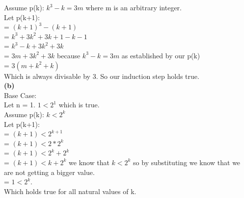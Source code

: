 Assume p(k): $k^3-k = 3m$ where m is an arbitrary integer.\\
Let p(k+1):\\
 = $(k + 1)^3 - (k + 1)$\\
 = $k^3 + 3k^2 + 3k + 1 - k - 1$\\
 = $k^3 - k +3k^2 + 3k$\\
 = $3m +3k^2 + 3k$ because $k^3 - k = 3m$ as established by our p(k)\\
 = $3(m +k^2 + k)$\\
 Which is always divisable by 3. So our induction step holds true. {\Huge\Bat}\\
\textbf{(b)}\\
Base Case:\\
Let n = 1. $1<2^1$ which is true.\\

Assume p(k): $k < 2^k$\\
Let p(k+1):\\
 = $(k + 1) < 2^{k + 1}$\\
 = $(k + 1) < 2*2^{k}$\\
 = $(k + 1) < 2^{k} + 2^{k}$\\
 = $(k + 1) < k + 2^{k}$ we know that $k < 2^k$ so by substituting we know that we are not getting a bigger value.\\
  = $ 1 < 2^{k}$.\\
  Which holds true for all natural values of k.{\Huge\Bat}

